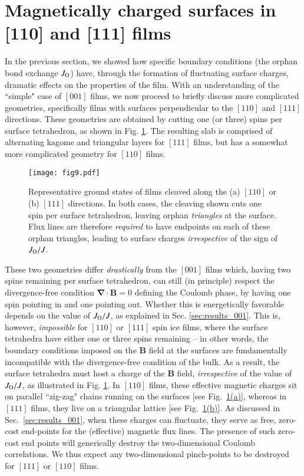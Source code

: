 \documentclass[aps,prx,reprint,runinaddress,superscriptaddress,amsmath,amssymb,floatfix,longbibliography]{revtex4-1}
\renewcommand{\vec}[1]{\boldsymbol{#1}}
\newcommand{\Jo}{J_{\rm O}}
\newcommand{\subref}[2]{\ref{#1}\hyperref[#1]{#2}}
\begin{document}
\section{Magnetically charged surfaces in [110] and [111] films}
\label{sec:non-neutral}

In the previous section, we showed how specific boundary conditions (the orphan bond exchange $\Jo$) have, through the formation of fluctuating surface charges, dramatic effects on the properties of the film. With an understanding of the ``simple" case of $[001]$ films, we now proceed to briefly discuss more complicated geometries, specifically films with surfaces perpendicular to the $[110]$ and $[111]$ directions. These geometries are obtained by cutting one (or three) spins per surface tetrahedron, as shown in Fig. \ref{fig:surfaces}. The resulting slab is comprised of alternating kagome and triangular layers for $[111]$ films, but has a somewhat more complicated geometry for $[110]$ films.

%
\begin{figure}
  \centering
  \texttt{[image: fig9.pdf]}
    \caption{Representative ground states of films cleaved along the (a) $[110]$ or (b) $[111]$ directions. In both cases, the cleaving shown cuts one spin per surface tetrahedron, leaving orphan \emph{triangles} at the surface. Flux lines are therefore \emph{required} to have endpoints on each of these orphan triangles, leading to surface charges \emph{irrespective} of the sign of $\Jo/J$. }
	\label{fig:surfaces}
\end{figure}
%

These two geometries differ \emph{drastically} from the $[001]$ films which, having two spins remaining per surface tetrahedron, can still (in principle) respect the divergence-free condition $\vec{\nabla} \cdot \vec{B} = 0$ defining the Coulomb phase, by having one spin pointing in and one pointing out. Whether this is energetically favorable depends on the value of $\Jo/J$, as explained in Sec. \ref{sec:results_001}. This is, however, \emph{impossible} for $[110]$ or $[111]$ spin ice films, where the surface tetrahedra have either one or three spins remaining -- in other words, the boundary conditions imposed on the $\vec{B}$ field at the surfaces are fundamentally incompatible with the divergence-free condition of the bulk. As a result, the surface tetrahedra must host a charge of the $\vec{B}$ field, \emph{irrespective} of the value of $\Jo/J$, as illustrated in Fig. \ref{fig:surfaces}. In $[110]$ films, these effective magnetic charges sit on parallel ``zig-zag" chains running on the surfaces [see Fig.~\subref{fig:surfaces}{(a)}], whereas in $[111]$ films, they live on a triangular lattice [see Fig.~\subref{fig:surfaces}{(b)}]. As discussed in Sec.~\ref{sec:results_001}, when these charges can fluctuate, they serve as free, zero-cost end-points for the (effective) magnetic flux lines. The presence of such zero-cost end points will generically destroy the two-dimensional Coulomb correlations. We thus expect any two-dimensional pinch-points to be destroyed for $[111]$ or $[110]$ films. 
\end{document}
